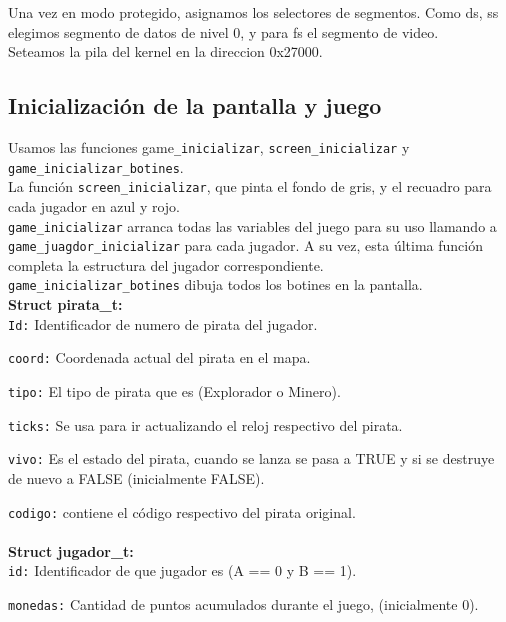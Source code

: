Una vez en modo protegido, asignamos los selectores de segmentos. Como ds, ss elegimos segmento de datos de nivel 0, y para fs el segmento de video.\\

Seteamos la pila del kernel en la direccion 0x27000.\\

\subsection{Inicialización de la pantalla y juego}

Usamos las funciones game\texttt{\_inicializar}, \texttt{screen\_inicializar} y \texttt{game\_inicializar\_botines}.\\

La función \texttt{screen\_inicializar}, que pinta el fondo de gris, y el recuadro para cada jugador en azul y rojo.\\
\texttt{game\_inicializar} arranca todas las variables del juego para su uso llamando a \texttt{game\_juagdor\_inicializar} para cada jugador. A su vez, esta última función completa la estructura del jugador correspondiente.\\
\texttt{game\_inicializar\_botines} dibuja todos los botines en la pantalla.\\

\textbf{Struct pirata\_t:}\\

\texttt{Id:} Identificador de numero de pirata del jugador.

\texttt{coord:} Coordenada actual del pirata en el mapa.

\texttt{tipo:} El tipo de pirata que es (Explorador o Minero).

\texttt{ticks:} Se usa para ir actualizando el reloj respectivo del pirata.

\texttt{vivo:} Es el estado del pirata, cuando se lanza se pasa a TRUE y si se destruye de nuevo a FALSE (inicialmente FALSE).

\texttt{\*codigo:} contiene el código respectivo del pirata original.\\\\

\textbf{Struct jugador\_t:}\\

\texttt{id:} Identificador de que jugador es (A == 0 y B == 1).

\texttt{monedas:} Cantidad de puntos acumulados durante el juego, (inicialmente 0).

